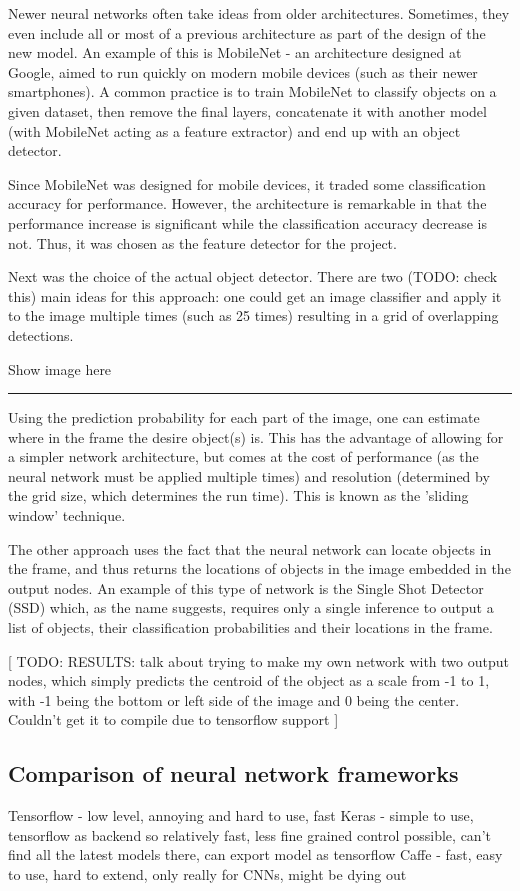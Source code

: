 Newer neural networks often take ideas from older architectures. Sometimes, they even include all or most of a previous architecture as part of the design of the new model. An example of this is MobileNet - an architecture designed at Google, aimed to run quickly on modern mobile devices (such as their newer smartphones). A common practice is to train MobileNet to classify objects on a given dataset, then remove the final layers, concatenate it with another model (with MobileNet acting as a feature extractor) and end up with an object detector.

Since MobileNet was designed for mobile devices, it traded some classification accuracy for performance. However, the architecture is remarkable in that the performance increase is significant while the classification accuracy decrease is not. Thus, it was chosen as the feature detector for the project.

Next was the choice of the actual object detector. There are two (TODO: check this) main ideas for this approach: one could get an image classifier and apply it to the image multiple times (such as 25 times) resulting in a grid of overlapping detections.

{\Large Show image here}
\hrule

Using the prediction probability for each part of the image, one can estimate where in the frame the desire object(s) is. This has the advantage of allowing for a simpler network architecture, but comes at the cost of performance (as the neural network must be applied multiple times) and resolution (determined by the grid size, which determines the run time). This is known as the 'sliding window' technique.

The other approach uses the fact that the neural network can locate objects in the frame, and thus returns the locations of objects in the image embedded in the output nodes. An example of this type of network is the Single Shot Detector (SSD) which, as the name suggests, requires only a single inference to output a list of objects, their classification probabilities and their locations in the frame.

[ TODO: RESULTS: talk about trying to make my own network with two output nodes, which simply predicts the centroid of the object as a scale from -1 to 1, with -1 being the bottom or left side of the image and 0 being the center. Couldn't get it to compile due to tensorflow support ]

\subsection{Comparison of neural network frameworks}
Tensorflow - low level, annoying and hard to use, fast
Keras - simple to use, tensorflow as backend so relatively fast, less fine grained control possible, can't find all the latest models there, can export model as tensorflow
Caffe - fast, easy to use, hard to extend, only really for CNNs, might be dying out
